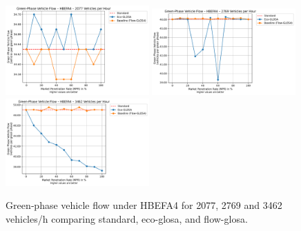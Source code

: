 \begin{figure}[htb]
  \centering
  \includegraphics[width=0.49\textwidth]{data/img/GreenPhaseVehicleFlow/GreenPhaseVehicleFlow_HBEFA4_Cars1500.pdf}
  \includegraphics[width=0.49\textwidth]{data/img/GreenPhaseVehicleFlow/GreenPhaseVehicleFlow_HBEFA4_Cars2000.pdf}
  \includegraphics[width=0.49\textwidth]{data/img/GreenPhaseVehicleFlow/GreenPhaseVehicleFlow_HBEFA4_Cars2500.pdf}
  \caption{Green‐phase vehicle flow under HBEFA4 for 2077, 2769 and 3462 vehicles/h comparing standard, \ac{eco-glosa}, and \ac{flow-glosa}.}
  \label{fig:HBEFA4_Flow}
\end{figure}

